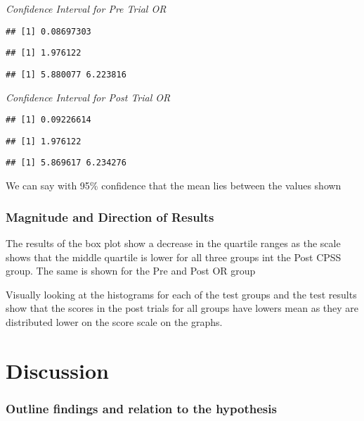 \documentclass[
]{article}
\begin{document}
\emph{Confidence Interval for Pre Trial OR}

\begin{verbatim}
## [1] 0.08697303
\end{verbatim}

\begin{verbatim}
## [1] 1.976122
\end{verbatim}

\begin{verbatim}
## [1] 5.880077 6.223816
\end{verbatim}

\emph{Confidence Interval for Post Trial OR}

\begin{verbatim}
## [1] 0.09226614
\end{verbatim}

\begin{verbatim}
## [1] 1.976122
\end{verbatim}

\begin{verbatim}
## [1] 5.869617 6.234276
\end{verbatim}

We can say with 95\% confidence that the mean lies between the values
shown

\hypertarget{magnitude-and-direction-of-results}{%
\subsubsection{\texorpdfstring{\textbf{Magnitude and Direction of
Results}}{Magnitude and Direction of Results}}\label{magnitude-and-direction-of-results}}

The results of the box plot show a decrease in the quartile ranges as
the scale shows that the middle quartile is lower for all three groups
int the Post CPSS group. The same is shown for the Pre and Post OR group

Visually looking at the histograms for each of the test groups and the
test results show that the scores in the post trials for all groups have
lowers mean as they are distributed lower on the score scale on the
graphs.

\hypertarget{discussion-1}{%
\section{Discussion}\label{discussion-1}}

\hypertarget{outline-findings-and-relation-to-the-hypothesis}{%
\subsubsection{\texorpdfstring{\textbf{Outline findings and relation to
the
hypothesis}}{Outline findings and relation to the hypothesis}}\label{outline-findings-and-relation-to-the-hypothesis}}
\end{document}
